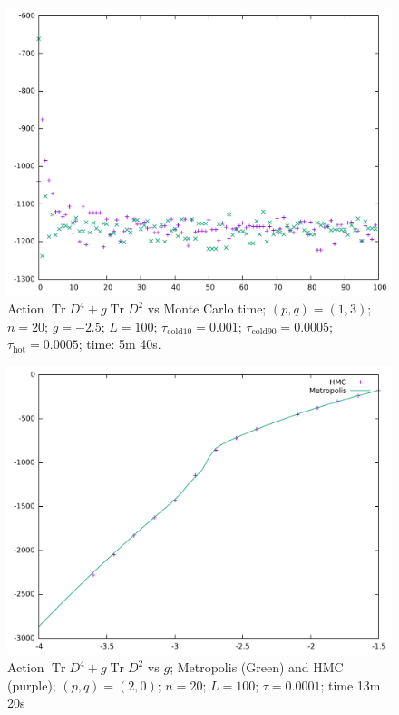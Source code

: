 \documentclass[12pt,a4paper]{article}
\DeclareMathOperator{\Tr}{Tr}
\begin{document}
\begin{figure}[!htb]
\includegraphics[width=1\linewidth]{p1q3n20g25.pdf}
\caption{Action $\Tr D^4 + g\Tr D^2$ vs Monte Carlo time; $(p,q)=(1,3)$; $n=20$; $g=-2.5$; $L=100$; $\tau_\text{cold10} = 0.001$; $\tau_\text{cold90} = 0.0005$; $\tau_\text{hot} = 0.0005$; time: 5m 40s.}
\end{figure}

\begin{figure}[!htb]
\includegraphics[width=1\linewidth]{p2q0n20S.pdf}
\caption{Action $\Tr D^4 + g\Tr D^2$ vs $g$; Metropolis (Green) and HMC (purple); $(p,q)=(2,0)$; $n=20$; $L=100$; $\tau = 0.0001$; time 13m 20s}
\end{figure}
\end{document}
